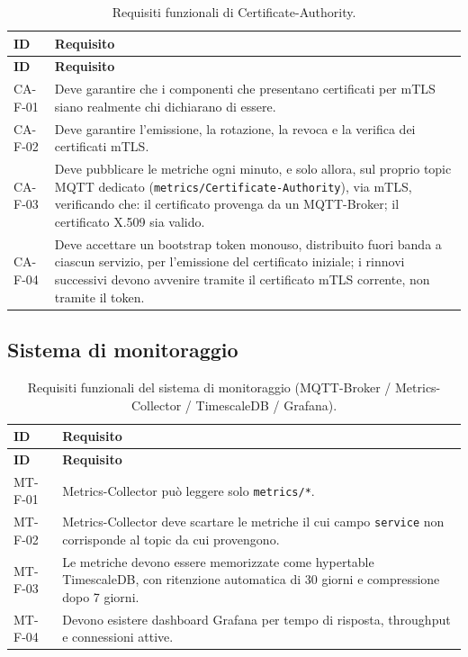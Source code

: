 \begin{longtable}{p{2.6cm} p{\dimexpr\linewidth-2.6cm-4\tabcolsep\relax}}
\caption{Requisiti funzionali di Certificate-Authority.} \\
\hline
\textbf{ID} & \textbf{Requisito} \\
\hline
\endfirsthead
\hline
\textbf{ID} & \textbf{Requisito} \\
\hline
\endhead
\hline
\endfoot
\hline
\endlastfoot
CA-F-01 & Deve garantire che i componenti che presentano certificati per mTLS siano realmente chi dichiarano di essere. \\
CA-F-02 & Deve garantire l'emissione, la rotazione, la revoca e la verifica dei certificati mTLS. \\
CA-F-03 & Deve pubblicare le metriche ogni minuto, e solo allora, sul proprio topic MQTT dedicato (\texttt{metrics/Certificate-Authority}), via mTLS, verificando che: il certificato provenga da un MQTT-Broker; il certificato X.509 sia valido. \\
CA-F-04 & Deve accettare un bootstrap token monouso, distribuito fuori banda a ciascun servizio, per l'emissione del certificato iniziale; i rinnovi successivi devono avvenire tramite il certificato mTLS corrente, non tramite il token. \\
\end{longtable}

\subsection{Sistema di monitoraggio}

\begin{longtable}{p{2.6cm} p{\dimexpr\linewidth-2.6cm-4\tabcolsep\relax}}
\caption{Requisiti funzionali del sistema di monitoraggio (MQTT-Broker / Metrics-Collector / TimescaleDB / Grafana).} \\
\hline
\textbf{ID} & \textbf{Requisito} \\
\hline
\endfirsthead
\hline
\textbf{ID} & \textbf{Requisito} \\
\hline
\endhead
\hline
\endfoot
\hline
\endlastfoot
MT-F-01 & Metrics-Collector può leggere solo \texttt{metrics/*}. \\
MT-F-02 & Metrics-Collector deve scartare le metriche il cui campo \texttt{service} non corrisponde al topic da cui provengono. \\
MT-F-03 & Le metriche devono essere memorizzate come hypertable TimescaleDB, con ritenzione automatica di 30 giorni e compressione dopo 7 giorni. \\
MT-F-04 & Devono esistere dashboard Grafana per tempo di risposta, throughput e connessioni attive. \\
\end{longtable}

